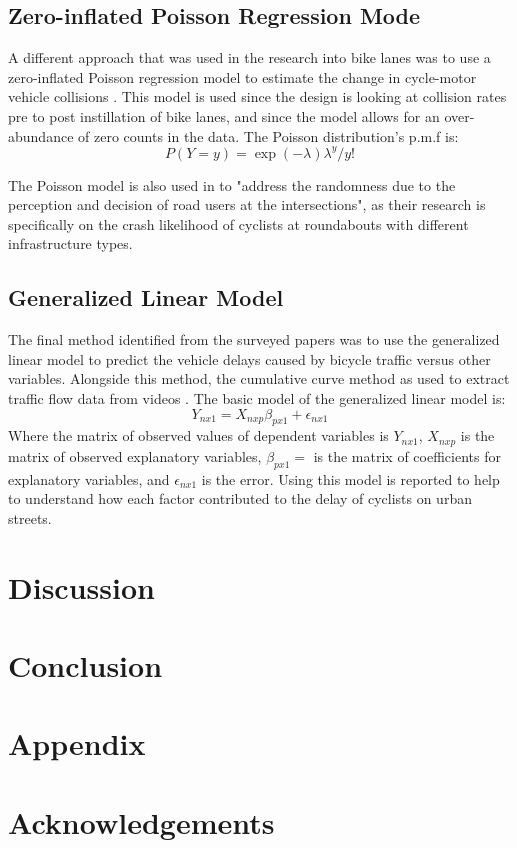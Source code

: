\documentclass[12pt, letterpaper]{article}
\begin{document}
\subsection{Zero-inflated Poisson Regression Mode}
\label{sec:pois}

A different approach that was used in the research into bike lanes was to use a zero-inflated Poisson regression model to estimate the change in cycle-motor vehicle collisions \cite{8Bhatia2016}. This model is used since the design is looking at collision rates pre to post instillation of bike lanes, and since the model allows for an over-abundance of zero counts in the data. The Poisson distribution's p.m.f is:
\[P(Y=y) = \exp{(-\lambda)\lambda^{y}}/y!\]

The Poisson model is also used in \citet{9Cantisani2021} to "address the randomness due to the perception and decision of road users at the intersections", as their research is specifically on the crash likelihood of cyclists at roundabouts with different infrastructure types. 

\subsection{Generalized Linear Model}
\label{sec:gen}

The final method identified from the surveyed papers was to use the generalized linear model to predict the vehicle delays caused by bicycle traffic versus other variables. Alongside this method, the cumulative curve method as used to extract traffic flow data from videos \cite{6Pu2017}. The basic model of the generalized linear model is:
\[Y_{nx1} = X_{nxp}\beta_{px1}+\epsilon_{nx1}\]
Where the matrix of observed values of dependent variables is  $Y_{nx1}$, $X_{nxp}$ is the matrix of observed explanatory variables, $\beta_{px1} =$ is the matrix of coefficients for explanatory variables, and $\epsilon_{nx1}$ is the error. Using this model is reported to help to understand how each factor contributed to the delay of cyclists on urban streets.   

\section{Discussion}
\label{sec:disc}



\section{Conclusion}
\label{sec:conc}

\section{Appendix}
\label{sec:appendix}


\section{Acknowledgements}
\label{sec:acknow}



\end{document}
